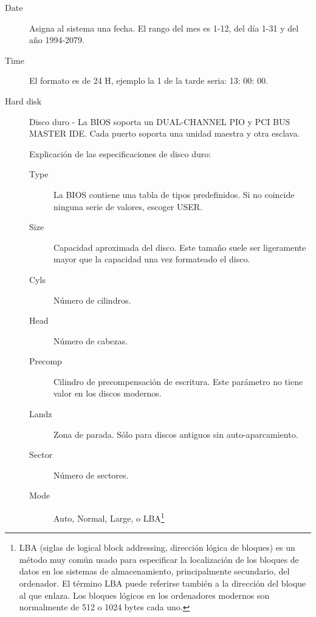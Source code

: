 			\begin{description}
				\item[Date] Asigna al sistema una fecha. El rango del mes es 1-12, del día 1-31 y del año 1994-2079.
				\item[Time] El formato es de 24 H, ejemplo la 1 de la tarde seria: 13: 00: 00.
				\item[Hard disk] Disco duro - La BIOS soporta un
					DUAL-CHANNEL PIO y PCI BUS MASTER IDE. Cada puerto soporta
					una unidad maestra y otra esclava.

					{\large Explicación de las especificaciones de disco duro:}
                
					\begin{description}
						\item[Type] La BIOS contiene una tabla de tipos
							predefinidos. Si no coincide ninguna serie de
							valores, escoger USER.
						\item[Size] Capacidad aproximada del disco. Este tamaño
							suele ser ligeramente mayor que la capacidad una
							vez formateado el disco.
						\item[Cyls] Número de cilindros.
						\item[Head] Número de cabezas.
						\item[Precomp] Cilindro de precompensación de
							escritura. Este parámetro no tiene valor en los
							discos modernos.
					    \item[Landz] Zona de parada. Sólo para discos antiguos sin auto-aparcamiento.
					    \item[Sector] Número de sectores.
						\item[Mode] Auto, Normal, Large, o LBA\footnote{LBA
							(siglas de logical block addressing, dirección
							lógica de bloques) es un método muy común usado
							para especificar la localización de los bloques de
							datos en los sistemas de almacenamiento,
							principalmente secundario, del ordenador. El
							término LBA puede referirse también a la dirección
							del bloque al que enlaza.  Los bloques lógicos en
							los ordenadores modernos son normalmente de 512 o
							1024 bytes cada uno.}


\end{description}
\end{description}
